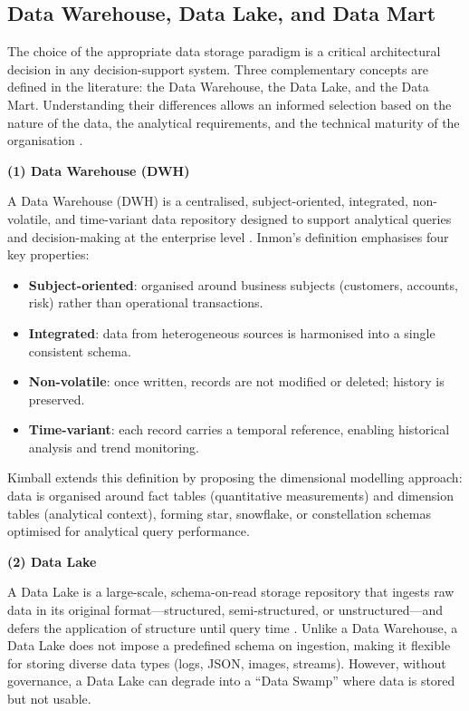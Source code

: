 \subsection{Data Warehouse, Data Lake, and Data Mart}

The choice of the appropriate data storage paradigm is a critical architectural decision in
any decision-support system. Three complementary concepts are defined in the literature:
the Data Warehouse, the Data Lake, and the Data Mart. Understanding their differences allows
an informed selection based on the nature of the data, the analytical requirements, and the
technical maturity of the organisation \cite{kimball2013, inmon2005}.

\textbf{(1) Data Warehouse (DWH)}

A Data Warehouse (DWH) is a centralised, subject-oriented, integrated, non-volatile, and
time-variant data repository designed to support analytical queries and decision-making at
the enterprise level \cite{inmon2005}. Inmon's definition emphasises four key properties:

\begin{itemize}
    \item \textbf{Subject-oriented}: organised around business subjects (customers, accounts,
    risk) rather than operational transactions.
    \item \textbf{Integrated}: data from heterogeneous sources is harmonised into a single
    consistent schema.
    \item \textbf{Non-volatile}: once written, records are not modified or deleted; history
    is preserved.
    \item \textbf{Time-variant}: each record carries a temporal reference, enabling
    historical analysis and trend monitoring.
\end{itemize}

Kimball \cite{kimball2013} extends this definition by proposing the dimensional modelling
approach: data is organised around fact tables (quantitative measurements) and dimension
tables (analytical context), forming star, snowflake, or constellation schemas optimised
for analytical query performance.

\textbf{(2) Data Lake}

A Data Lake is a large-scale, schema-on-read storage repository that ingests raw data in
its original format---structured, semi-structured, or unstructured---and defers the
application of structure until query time \cite{kimball2013}. Unlike a Data Warehouse, a
Data Lake does not impose a predefined schema on ingestion, making it flexible for storing
diverse data types (logs, JSON, images, streams). However, without governance, a Data Lake
can degrade into a ``Data Swamp'' where data is stored but not usable.

